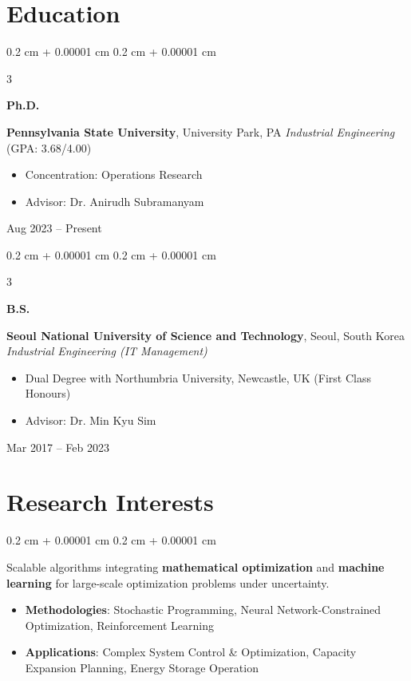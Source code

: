 \documentclass[10pt, letterpaper]{article}
\newenvironment{highlights}{
    \begin{itemize}[
        topsep=0.10 cm,
        parsep=0.10 cm,
        partopsep=0pt,
        itemsep=0pt,
        leftmargin=0.4 cm + 10pt
    ]
}{
    \end{itemize}
} %
\newenvironment{onecolentry}{
    \begin{adjustwidth}{
        0.2 cm + 0.00001 cm
    }{
        0.2 cm + 0.00001 cm
    }
}{
    \end{adjustwidth}
} %
\newenvironment{threecolentry}[3][]{
    \onecolentry
    \def\thirdColumn{#3}
    \setcolumnwidth{1 cm, \fill, 3.8 cm}
    \begin{paracol}{3}
    {\raggedright #2} \switchcolumn
}{
    \switchcolumn \raggedleft \thirdColumn
    \end{paracol}
    \endonecolentry
} %
\begin{document}
\section{Education}

    \begin{threecolentry}{\textbf{Ph.D.}}{
        Aug 2023 – Present
    }
        \textbf{Pennsylvania State University}, University Park, PA
        \newline
        \textit{Industrial Engineering} (GPA: 3.68/4.00)
        \begin{highlights}
            \item Concentration: Operations Research
            \item Advisor: Dr. Anirudh Subramanyam
        \end{highlights}
    \end{threecolentry}

    \begin{threecolentry}{\textbf{B.S.}}{
        Mar 2017 – Feb 2023
    }
        \textbf{Seoul National University of Science and Technology}, Seoul, South Korea
        \newline
        \textit{Industrial Engineering (IT Management)}
        \begin{highlights}
            \item Dual Degree with Northumbria University, Newcastle, UK (First Class Honours)
            \item Advisor: Dr. Min Kyu Sim
        \end{highlights}
    \end{threecolentry}

\section{Research Interests}
\begin{onecolentry}

Scalable algorithms integrating \textbf{mathematical optimization} and \textbf{machine learning} for large-scale optimization problems under uncertainty. 
\begin{itemize}
    \item \textbf{Methodologies}: Stochastic Programming, Neural Network-Constrained Optimization, Reinforcement Learning
    \item \textbf{Applications}: Complex System Control \& Optimization, Capacity Expansion Planning, Energy Storage Operation %
\end{itemize}
\end{onecolentry}
\end{document}
